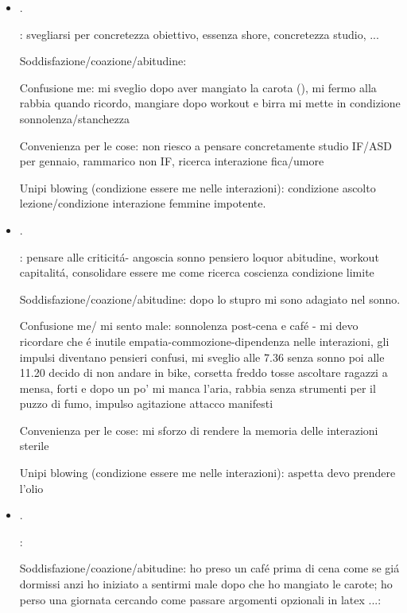 \begin{itemize}
\item {}.

: svegliarsi per concretezza obiettivo, essenza shore, concretezza studio, ...

Soddisfazione/coazione/abitudine: 

Confusione me: mi sveglio dopo aver mangiato la carota (), mi fermo alla rabbia quando ricordo, mangiare dopo workout e birra mi mette in condizione sonnolenza/stanchezza

Convenienza per le cose: non riesco a pensare concretamente studio IF/ASD per gennaio, rammarico non IF, ricerca interazione fica/umore

Unipi blowing (condizione essere me nelle interazioni): condizione ascolto lezione/condizione interazione femmine impotente.

\item {}.

: pensare alle criticit\'a- angoscia sonno pensiero loquor abitudine, workout capitalit\'a, consolidare essere me come ricerca coscienza condizione limite

Soddisfazione/coazione/abitudine: dopo lo stupro mi sono adagiato nel sonno.

Confusione me/ mi sento male: sonnolenza post-cena e caf\'e - mi devo ricordare che \'e inutile empatia-commozione-dipendenza nelle interazioni, gli impulsi diventano pensieri confusi, mi sveglio alle 7.36 senza sonno poi alle 11.20 decido di non andare in bike, corsetta freddo tosse ascoltare ragazzi a mensa, forti e dopo un po' mi manca l'aria, rabbia senza strumenti per il puzzo di fumo, impulso agitazione attacco manifesti

Convenienza per le cose: mi sforzo di rendere la memoria delle interazioni sterile

Unipi blowing (condizione essere me nelle interazioni): aspetta devo prendere l'olio

\item {}.

:

Soddisfazione/coazione/abitudine: ho preso un caf\'e prima di cena come se gi\'a dormissi anzi ho iniziato a sentirmi male dopo che ho mangiato le carote; ho perso una giornata cercando come passare argomenti opzionali in latex ...:


\end{itemize}
